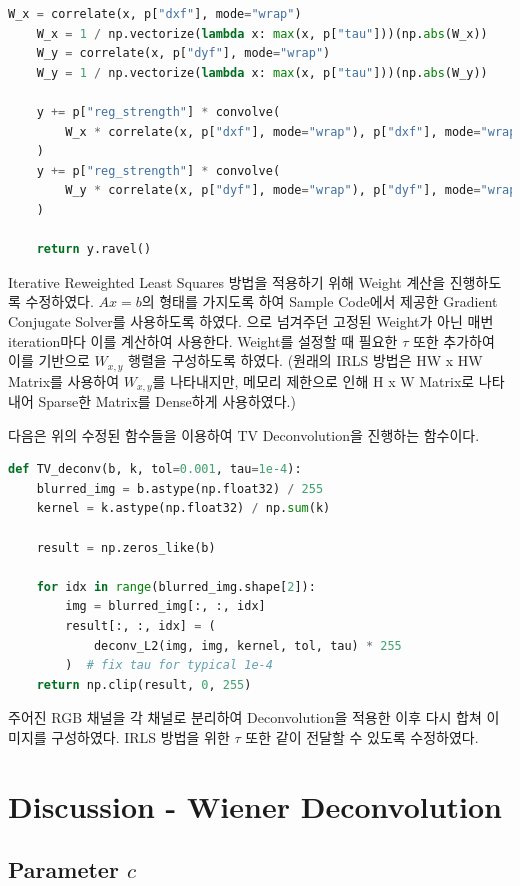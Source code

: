 \documentclass{report}
\begin{document}
\begin{lstlisting}[language=Python, caption=Modified Code, firstnumber=90]
    W_x = correlate(x, p["dxf"], mode="wrap")
    W_x = 1 / np.vectorize(lambda x: max(x, p["tau"]))(np.abs(W_x))
    W_y = correlate(x, p["dyf"], mode="wrap")
    W_y = 1 / np.vectorize(lambda x: max(x, p["tau"]))(np.abs(W_y))

    y += p["reg_strength"] * convolve(
        W_x * correlate(x, p["dxf"], mode="wrap"), p["dxf"], mode="wrap"
    )
    y += p["reg_strength"] * convolve(
        W_y * correlate(x, p["dyf"], mode="wrap"), p["dyf"], mode="wrap"
    )

    return y.ravel()
\end{lstlisting}

Iterative Re\-weighted Least Squares 방법을 적용하기 위해 Weight 계산을 진행하도록 수정하였다.
$Ax=b$의 형태를 가지도록 하여 Sample Code에서 제공한 Gradient Conjugate Solver를 사용하도록 하였다.
으로 넘겨주던 고정된 Weight가 아닌 매번 iteration마다 이를 계산하여 사용한다.
Weight를 설정할 때 필요한 $\tau$ 또한 추가하여 이를 기반으로 $W_{x,y}$ 행렬을 구성하도록 하였다.
(원래의 IRLS 방법은 HW x HW Matrix를 사용하여 $W_{x,y}$를 나타내지만, 메모리 제한으로 인해 
H x W Matrix로 나타내어 Sparse한 Matrix를 Dense하게 사용하였다.)

다음은 위의 수정된 함수들을 이용하여 TV Deconvolution을 진행하는 함수이다.

\begin{lstlisting}[language=Python, caption=TV\_deconv, firstnumber=197]
def TV_deconv(b, k, tol=0.001, tau=1e-4):
    blurred_img = b.astype(np.float32) / 255
    kernel = k.astype(np.float32) / np.sum(k)

    result = np.zeros_like(b)

    for idx in range(blurred_img.shape[2]):
        img = blurred_img[:, :, idx]
        result[:, :, idx] = (
            deconv_L2(img, img, kernel, tol, tau) * 255
        )  # fix tau for typical 1e-4
    return np.clip(result, 0, 255)
\end{lstlisting}

주어진 RGB 채널을 각 채널로 분리하여 Deconvolution을 적용한 이후 다시 합쳐 이미지를 구성하였다.
IRLS 방법을 위한 $\tau$ 또한 같이 전달할 수 있도록 수정하였다.

\section*{Discussion - Wiener Deconvolution}

\subsection*{Parameter $c$}
\end{document}
